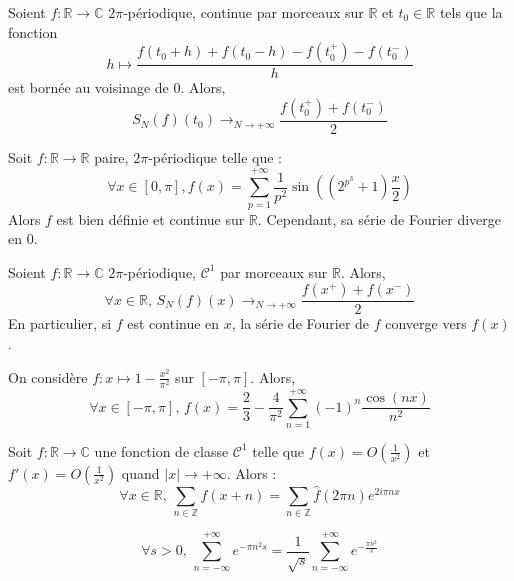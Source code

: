 
  \begin{theorem}
    Soient $f : \mathbb{R} \rightarrow \mathbb{C}$ $2\pi$-périodique, continue par morceaux sur $\mathbb{R}$ et $t_0 \in \mathbb{R}$ tels que la fonction
    \[ h \mapsto \frac{f(t_0 + h) + f(t_0 - h) - f(t_0^+) - f(t_0^-)}{h} \]
    est bornée au voisinage de $0$. Alors,
    \[ S_N(f)(t_0) \longrightarrow_{N \rightarrow +\infty} \frac{f(t_0^+) + f(t_0^-)}{2} \]
  \end{theorem}

  \begin{cexample}
    Soit $f : \mathbb{R} \rightarrow \mathbb{R}$ paire, $2\pi$-périodique telle que :
    \[ \forall x \in [0, \pi], f(x) = \sum_{p=1}^{+\infty} \frac{1}{p^2} \sin \left( (2^{p^3} + 1) \frac{x}{2} \right)
    \]
    Alors $f$ est bien définie et continue sur $\mathbb{R}$. Cependant, sa série de Fourier diverge en $0$.
  \end{cexample}

  \begin{corollary}
    Soient $f : \mathbb{R} \rightarrow \mathbb{C}$ $2\pi$-périodique, $\mathcal{C}^1$ par morceaux sur $\mathbb{R}$. Alors,
    \[ \forall x \in \mathbb{R}, \, S_N(f)(x) \longrightarrow_{N \rightarrow +\infty} \frac{f(x^+) + f(x^-)}{2} \]
    En particulier, si $f$ est continue en $x$, la série de Fourier de $f$ converge vers $f(x)$.
  \end{corollary}

  \begin{example}
    On considère $f : x \mapsto 1 - \frac{x^2}{\pi^2}$ sur $[-\pi, \pi]$. Alors,
    \[ \forall x \in [-\pi, \pi], \, f(x) = \frac{2}{3} - \frac{4}{\pi^2} \sum_{n=1}^{+\infty} (-1)^n \frac{\cos(nx)}{n^2} \]
  \end{example}


  \begin{theorem}
    Soit $f : \mathbb{R} \rightarrow \mathbb{C}$ une fonction de classe $\mathcal{C}^1$ telle que $f(x) = O \left( \frac{1}{x^2} \right)$ et $f'(x) = O \left( \frac{1}{x^2} \right)$ quand $|x| \longrightarrow +\infty$. Alors :
    \[ \forall x \in \mathbb{R}, \, \sum_{n \in \mathbb{Z}} f(x+n) = \sum_{n \in \mathbb{Z}} \widehat{f}(2 \pi n) e^{2 i \pi n x} \]
  \end{theorem}

  \begin{application}
    \[ \forall s > 0, \, \sum_{n=-\infty}^{+\infty} e^{-\pi n^2 s} = \frac{1}{\sqrt{s}} \sum_{n=-\infty}^{+\infty} e^{-\frac{\pi n^2}{s}} \]
  \end{application}

